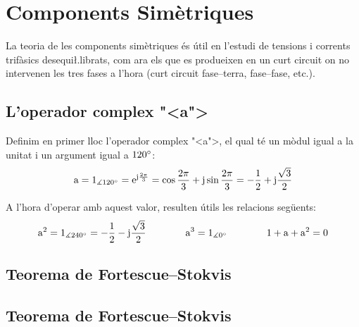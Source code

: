 \chapter{Components Sim\`{e}triques} 

La teoria de les components sim\`{e}triques \'{e}s \'{u}til en l'estudi de
tensions i corrents trif\`{a}sics
 desequi{\l.l}ibrats, com ara els que es produeixen en un curt circuit on no intervenen les tres
 fases a l'hora (curt circuit fase--terra, fase--fase, etc.).

\section{L'operador complex {"<}a{">}}

Definim en primer lloc l'operador complex {"<}a{">}, el qual t\'{e} un m\`{o}dul
igual a la unitat i un argument igual a $120^\circ$: 
\begin{equation}
   \mathrm{a} = 1_{\measuredangle 120^\circ} = \mathrm{e}^{\mathrm{j}\frac{2\pi}{3}} =
   \cos \frac{2\pi}{3} + \mathrm{j} \sin \frac{2\pi}{3} = - \frac{1}{2} + \mathrm{j} \frac{\sqrt{3}}{2}
\end{equation}

A l'hora d'operar amb aquest valor, resulten \'{u}tils les relacions
seg\"{u}ents:
\begin{equation}
   \mathrm{a}^2 = 1_{\measuredangle 240^\circ}= - \frac{1}{2} - \mathrm{j} \frac{\sqrt{3}}{2}\qquad\qquad
   \mathrm{a}^3 = 1_{\measuredangle 0^\circ} \qquad\qquad
   1+ \mathrm{a} + \mathrm{a}^2 = 0
\end{equation}

\ifpdf
    \section{\texorpdfstring{Teorema de Fortescue--Stokvis}{Teorema de Fortescue-Stokvis}}
\else
    \section{Teorema de Fortescue--Stokvis}
\fi {}

